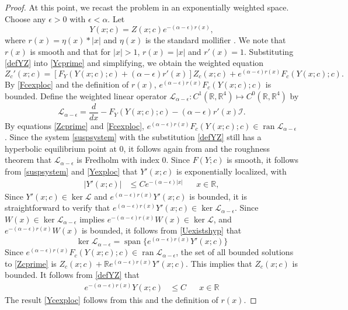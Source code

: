 \documentclass[review,onefignum,onetabnum]{siamart171218}
\newcommand{\R}{\mathbb{R}}
\def\ker{\mathop\mathrm{ker}\nolimits}
\def\Ran{\mathop\mathrm{ran}\nolimits}
\def\Span{\mathop\mathrm{span}\nolimits}
\newcommand{\calI}{\mathcal{I}}
\newcommand{\calL}{\mathcal{L}}
\begin{document}
\begin{lemma}
\begin{proof}
At this point, we recast the problem in an exponentially weighted space. Choose any $\epsilon > 0$ with $\epsilon < \alpha$. Let
\begin{equation}\label{defYZ}
Y(x; c) = Z(x; c) e^{-(\alpha - \epsilon)r(x)},
\end{equation}
where $r(x) = \eta(x) * |x|$ and $\eta(x)$ is the standard mollifier \cite[Section C.5]{Evans2010}. We note that $r(x)$ is smooth and that for $|x| > 1$, $r(x) = |x|$ and $r'(x) = 1$. Substituting \cref{defYZ} into \cref{Ycprime} and simplifying, we obtain the weighted equation
\begin{equation}\label{Zcprime}
Z_c'(x; c) = [F_Y(Y(x;c); c) + (\alpha - \epsilon) r'(x) ] Z_c(x; c) + e^{(\alpha - \epsilon)r(x)} F_c(Y(x;c); c).
\end{equation}
By \cref{Fcexploc} and the definition of $r(x)$, $e^{(\alpha - \epsilon)r(x)} F_c(Y(x;c); c)$ is bounded. Define the weighted linear operator $\calL_{\alpha - \epsilon}: C^1(\R, \R^4) \mapsto C^0(\R, \R^4)$ by
\begin{equation}\label{suspdefLalpha}
\calL_{\alpha - \epsilon} = \frac{d}{dx} - F_Y(Y(x;c); c) - (\alpha - \epsilon) r'(x) \calI.
\end{equation}
By equations \cref{Zcprime} and \cref{Fcexploc}, $e^{(\alpha - \epsilon)r(x)} F_c(Y(x;c); c) \in \Ran \calL_{\alpha - \epsilon}$. Since the system \cref{suspsystem} with the substitution \cref{defYZ} still has a hyperbolic equilibrium point at 0, it follows again from \cite[Lemma 4.2]{Palmer1984} and the roughness theorem that $\calL_{\alpha - \epsilon}$ is Fredholm with index 0. Since $F(Y; c)$ is smooth, it follows from \cref{suspsystem} and \cref{Yexploc} that $Y'(x; c)$ is exponentially localized, with
\begin{align}\label{Yprimeloc}
|Y'(x; c)| &\leq C e^{-(\alpha - \epsilon)|x|} && x \in \R,
\end{align}
Since $Y'(x; c) \in \ker \calL$ and $e^{(\alpha - \epsilon)r(x)} Y'(x; c)$ is bounded, it is straightforward to verify that $e^{(\alpha - \epsilon)r(x)} Y'(x; c) \in \ker \calL_{\alpha - \epsilon}$. Since $W(x) \in \ker \calL_{\alpha - \epsilon}$ implies $e^{-(\alpha - \epsilon)r(x)} W(x) \in \ker \calL$, and $e^{-(\alpha - \epsilon)r(x)} W(x)$ is bounded, it follows from \cref{Uexistshyp} that 
\[
\ker \calL_{\alpha - \epsilon} = \Span\{ e^{(\alpha - \epsilon)r(x)} Y'(x; c) \}
\]
Since $e^{(\alpha - \epsilon)r(x)} F_c(Y(x;c); c) \in \Ran \calL_{\alpha - \epsilon}$, the set of all bounded solutions to \cref{Zcprime} is $Z_c(x; c) + \R e^{(\alpha - \epsilon)r(x)} Y'(x;c)$. This implies that $Z_c(x; c)$ is bounded. It follows from \cref{defYZ} that 
\begin{align*}
e^{-(\alpha - \epsilon)r(x)} Y(x; c) &\leq C && x \in \R
\end{align*}
The result \cref{Ycexploc} follows from this and the definition of $r(x)$.
\end{proof}
\end{lemma}
\end{document}
